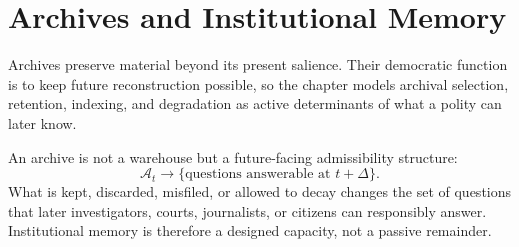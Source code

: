 
\chapter{Archives and Institutional Memory}
\label{ch:ch056}

Archives preserve material beyond its present salience. Their democratic function is to keep future reconstruction possible, so the chapter models archival selection, retention, indexing, and degradation as active determinants of what a polity can later know.

An archive is not a warehouse but a future-facing admissibility structure:
\[
\mathcal A_t
\longrightarrow
\{\text{questions answerable at }t+\Delta\}.
\]
What is kept, discarded, misfiled, or allowed to decay changes the set of questions that later investigators, courts, journalists, or citizens can responsibly answer. Institutional memory is therefore a designed capacity, not a passive remainder.
